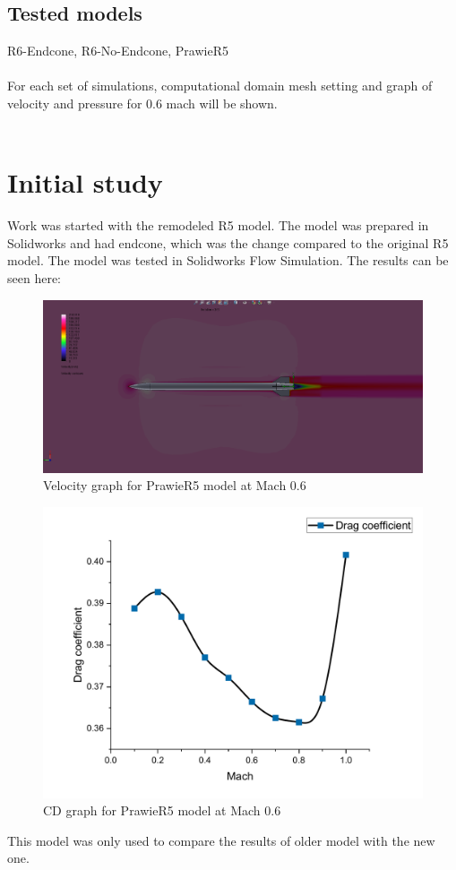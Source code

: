 \documentclass{article}
\begin{document}
\subsection{Tested models}
R6-Endcone, R6-No-Endcone, PrawieR5\\\\
For each set of simulations, computational domain mesh setting and graph of velocity and 
pressure for 0.6 mach will be shown.\\\\

\section{Initial study}
Work was started with the remodeled R5 model. The model was prepared in Solidworks and had 
endcone, which was the change compared to the original R5 model. The model was tested in
Solidworks Flow Simulation. The results can be seen here:

\begin{figure}[H]
    \centering
    \includegraphics[width=\textwidth]{../data/PrawieR5-Solid/PrawieR5-TR-Velocity-Mach06.png}
    \caption{Velocity graph for PrawieR5 model at Mach 0.6}
\end{figure}

\begin{figure}[H]
    \centering
    \includegraphics[width=\textwidth]{../data/PrawieR5-Solid/CD-PrawieR5.pdf}
    \caption{CD graph for PrawieR5 model at Mach 0.6}
\end{figure}
This model was only used to compare the results of older model with the new one. 
\end{document}
